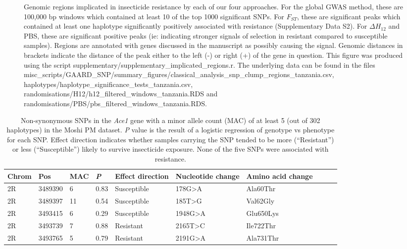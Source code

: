 \documentclass[a4paper,12pt]{article}
\begin{document}
\begin{figure}[h]
	\caption{\footnotesize Genomic regions implicated in insecticide resistance by each of our four approaches. For the global GWAS method, these are 100,000 bp windows which contained at least 10 of the top 1000 significant SNPs. For $F_{ST}$, these are significant peaks which contained at least one haplotype significantly positively associated with resistance (Supplementary Data S2). For $\Delta H_{12}$ and PBS, these are significant positive peaks (ie: indicating stronger signals of selection in resistant compared to susceptible samples). Regions are annotated with genes discussed in the manuscript as possibly causing the signal. Genomic distances in brackets indicate the distance of the peak either to the left (-) or right (+) of the gene in question. This figure was produced using the script supplementary/supplementary\_implicated\_regions.r. The underlying data can be found in the files \\ misc\_scripts/GAARD\_SNP/summary\_figures/classical\_analysis\_snp\_clump\_regions\_tanzania.csv, \\ haplotypes/haplotype\_significance\_tests\_tanzania.csv, \\ randomisations/H12/h12\_filtered\_windows\_tanzania.RDS and \\ randomisations/PBS/pbs\_filtered\_windows\_tanzania.RDS.}
	\label{FigS9}
\end{figure}

\clearpage


\begin{table}[!ht]
	\vspace{5cm}
	\footnotesize
    \centering
	\caption{Non-synonymous SNPs in the \textit{Ace1} gene with a minor allele count (MAC) of at least 5 (out of 302 haplotypes) in the Moshi PM dataset. \textit{P} value is the result of a logistic regression of genotype vs phenotype for each SNP. Effect direction indicates whether samples carrying the SNP tended to be more (``Resistant'') or less (``Susceptible'') likely to survive insecticide exposure. None of the five SNPs were associated with resistance.}
    \begin{tabular}{|l|l|l|l|l|l|l|l|l|l|}
    \hline
	\textbf{Chrom} & \textbf{Pos} & \textbf{MAC} & \textbf{\textit{P}} & \textbf{Effect direction} & \textbf{Nucleotide change} & \textbf{Amino acid change} \\ \hline
        2R & 3489390 & 6 & 0.83 & Susceptible & 178G>A & Ala60Thr \\ \hline
        2R & 3489397 & 11 & 0.54 & Susceptible & 185T>G & Val62Gly \\ \hline
        2R & 3493415 & 6 & 0.29 & Susceptible & 1948G>A & Glu650Lys \\ \hline
        2R & 3493739 & 7 & 0.88 & Resistant & 2165T>C & Ile722Thr \\ \hline
        2R & 3493765 & 5 & 0.79 & Resistant & 2191G>A & Ala731Thr \\ \hline
    \end{tabular}
\end{table}
\end{document}

